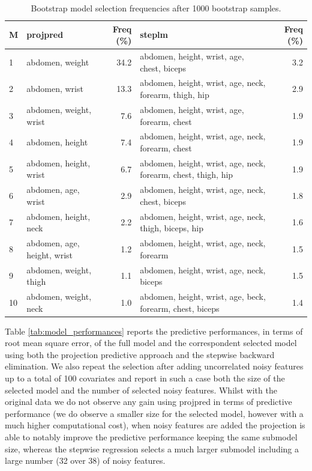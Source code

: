 \documentclass[american,]{article}
\theoremstyle{definition}
\begin{document}
\begin{table}[tp]
\scriptsize
\centering
\begin{tabular}{l||l|r||l|r}
  \hline
M & projpred & Freq (\%) & steplm & Freq (\%)  \\ 
  \hline
1 & abdomen, weight & 34.2 & abdomen, height, wrist, age, chest, biceps & 3.2 \\
2 & abdomen, wrist & 13.3 & abdomen, height, wrist, age, neck, forearm, thigh, hip & 2.9 \\
3 & abdomen, weight, wrist & 7.6 & abdomen, height, wrist, age, forearm, chest & 1.9 \\
4 & abdomen, height & 7.4 & abdomen, height, wrist, age, neck, forearm, chest & 1.9 \\
5 & abdomen, height, wrist & 6.7 & abdomen, height, wrist, age, neck, forearm, chest, thigh, hip & 1.9 \\
6 & abdomen, age, wrist & 2.9 & abdomen, height, wrist, age, neck, chest, biceps & 1.8 \\
7 & abdomen, height, neck & 2.2 & abdomen, height, wrist, age, neck, thigh, biceps, hip & 1.6 \\
8 & abdomen, age, height, wrist & 1.2 & abdomen, height, wrist, age, neck, forearm & 1.5 \\
9 & abdomen, weight, thigh & 1.1 & abdomen, height, wrist, age, neck, biceps & 1.5 \\
10 & abdomen, weight, neck & 1.0 & abdomen, height, wrist, age, beck, forearm, chest, biceps & 1.4 \\
   \hline
\end{tabular}
\caption{Bootstrap model selection frequencies after 1000 bootstrap samples.}
\label{tab:model_frequencies}
\end{table}

Table \ref{tab:model_performances} reports the predictive performances, in terms of root mean square error, of the full model and the correspondent selected model using both the projection predictive approach and the stepwise backward elimination. We also repeat the selection after adding uncorrelated noisy features up to a total of 100 covariates and report in such a case both the size of the selected model and the number of selected noisy features. Whilst with the original data we do not observe any gain using projpred in terms of predictive performance (we do observe a smaller size for the selected model, however with a much higher computational cost), when noisy features are added the projection is able to notably improve the predictive performance keeping the same submodel size, whereas the stepwise regression selects a much larger submodel including a large number (32 over 38) of noisy features.
\end{document}
